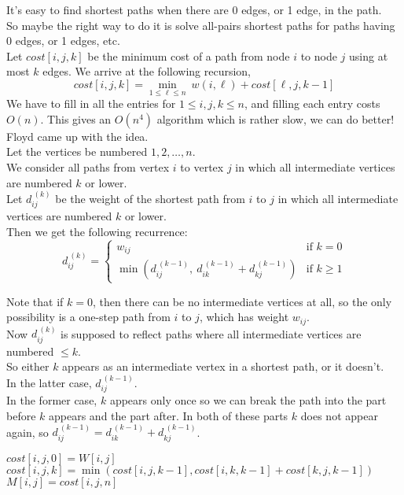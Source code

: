 \documentclass[12pt]{article}
\theoremstyle{plain}
\theoremstyle{definition}
\begin{document}
It's easy to find shortest paths when there are 0 edges, or 1 edge, in the path. \\
So maybe the right way to do it is solve all-pairs shortest paths for paths having 0 edges, or 1 edges, etc. \\
Let $cost[i, j, k]$ be the minimum cost of a path from node $i$ to node $j$ using at most $k$ edges.
We arrive at the following recursion,
$$cost[i, j, k] = \underset{1 \leq \ell \leq n}{\min} ~ w(i, \ell) + cost[\ell, j, k - 1]$$
We have to fill in all the entries for $1 \leq i, j, k \leq n$, and filling each entry costs $O(n)$.
This gives an $O(n^{4})$ algorithm which is rather slow, we can do better! \\

Floyd came up with the idea. \\
Let the vertices be numbered $1, 2, \dots, n$. \\
We consider all paths from vertex $i$ to vertex $j$ in which all intermediate vertices are numbered $k$ or lower. \\
Let $d_{ij}^{~(k)}$ be the weight of the shortest path from $i$ to $j$ in which all intermediate vertices are numbered $k$ or lower. \\

Then we get the following recurrence:
$$
d_{ij}^{~(k)} =
\begin{cases}
  w_{ij} & \text{if } k = 0 \\
  \min(d_{ij}^{~(k-1)},~d_{ik}^{~(k-1)} + d_{kj}^{~(k-1)}) & \text{if } k \geq 1
\end{cases}
$$

Note that if $k = 0$, then there can be no intermediate vertices at all, so the only possibility is a one-step path from $i$ to $j$, which has weight $w_{ij}$. \\

Now $d_{ij}^{~(k)}$ is supposed to reflect paths where all intermediate vertices are numbered $\leq k$. \\
So either $k$ appears as an intermediate vertex in a shortest path, or it doesn't. \\
In the latter case, $d_{ij}^{~(k-1)}$. \\
In the former case, $k$ appears only once so we can break the path into the part before $k$ appears and the part after.
In both of these parts $k$ does not appear again, so $d_{ij}^{~(k-1)} = d_{ik}^{~(k-1)} + d_{kj}^{~(k-1)}$. \\

\begin{algorithmic}
      \State $cost[i, j, 0] = W[i, j]$
    \EndFor
  \EndFor
        \State $cost[i, j, k] = \min(cost[i, j, k-1], cost[i, k, k-1] + cost[k, j, k-1])$
      \EndFor
    \EndFor
  \EndFor
      \State $M[i, j] = cost[i, j, n]$
    \EndFor
  \EndFor
  \State {}
\EndFunction
\end{algorithmic}
\end{document}
